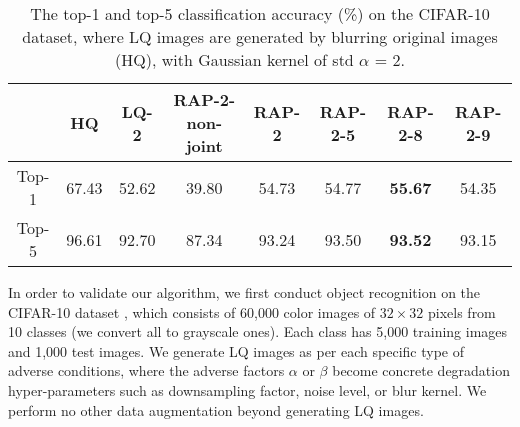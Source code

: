 \documentclass[10pt,twocolumn,twoside]{IEEEtran} %
\begin{document}
\begin{table}
	\label{CIFARsalt}
\end{table}\begin{table*}[t]
	\fontsize{10pt}{12pt}\selectfont
	\caption{The top-1 and top-5 classification accuracy (\%) on the CIFAR-10 dataset, where LQ images are generated by blurring original images (HQ), with Gaussian kernel of std $\alpha$ = 2.}
	\begin{center}
		\begin{tabular}{c|c|c|c|c|c|c|c}
			\hline
			& HQ & LQ-2 & RAP-2-non-joint & RAP-2 & RAP-2-5 & RAP-2-8 & RAP-2-9 \\ \hline
			\hline
			Top-1  & 67.43 & 52.62 & 39.80 & 54.73 & 54.77 & \textbf{55.67} & 54.35 \\ 
			Top-5  & 96.61 & 92.70 & 87.34 & 93.24 & 93.50 & \textbf{93.52} & 93.15 \\ 
			\hline
		\end{tabular}
	\end{center}
	
	\label{CIFARblur2}
\end{table*}

In order to validate our algorithm, we first conduct object recognition on
the CIFAR-10 dataset \cite{cifar}, which consists of  60,000 color images of $32 \times 32$ pixels from 10 classes (we convert all to grayscale ones). Each class has 5,000 training images and 1,000 test images. We generate LQ images as per each specific type of adverse conditions, where the adverse factors $\alpha$ or $\beta$ become concrete degradation hyper-parameters such as downsampling factor, noise level, or blur kernel. We perform no other data augmentation beyond generating LQ images. 
\end{document}
